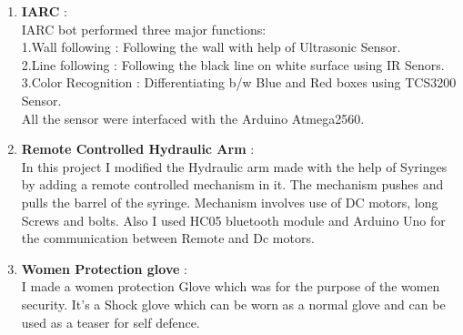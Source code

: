 \documentclass[11pt]{article}
\begin{document}
\begin{enumerate}[label=(\arabic*)]
\item\textbf{IARC} :\\
IARC bot performed three major functions:\\
1.Wall following : Following the wall with help of Ultrasonic Sensor.\\
2.Line following : Following the black line on white surface using IR Senors.\\
3.Color Recognition :  Differentiating b/w Blue and Red boxes using TCS3200 Sensor.\\                                     
All the sensor were interfaced with the Arduino Atmega2560.

\item\textbf{Remote Controlled Hydraulic Arm} :\\
In this project I modified the Hydraulic arm made with the help of Syringes by adding a remote controlled mechanism in it. The mechanism pushes and pulls the barrel of the syringe. Mechanism involves use of DC motors, long Screws and bolts. Also I used HC05 bluetooth module and Arduino Uno for the communication between Remote and Dc motors.

\item\textbf{Women Protection glove} :\\
I made a women protection Glove which was for the purpose of the women security.
It's a Shock glove which can be worn as a normal glove and can be used as a teaser for self defence.
\end{enumerate}
\end{document}
